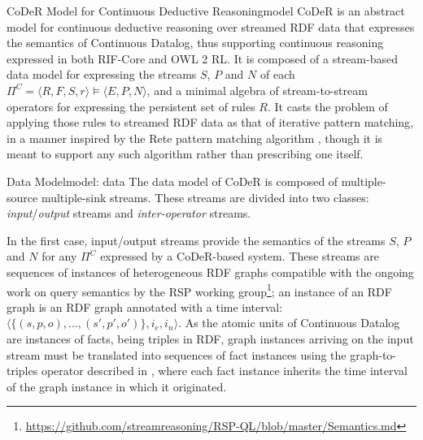 \begin{nestedsection}{CoDeR Model for Continuous Deductive Reasoning}{model}
	CoDeR is an abstract model for continuous deductive reasoning over streamed RDF data that expresses the semantics of Continuous Datalog, thus supporting continuous reasoning expressed in both RIF-Core and OWL 2 RL.
	It is composed of a stream-based data model for expressing the streams $S$, $P$ and $N$ of each ${\Pi^C = \langle R,F,S,r \rangle \vDash \langle E,P,N \rangle}$, and a minimal algebra of stream-to-stream operators for expressing the persistent set of rules $R$.
	It casts the problem of applying those rules to streamed RDF data as that of iterative pattern matching, in a manner inspired by the Rete pattern matching algorithm \citep{forgy79}, though it is meant to support any such algorithm rather than prescribing one itself.

	\begin{nestedsection}{Data Model}{model: data}
		The data model of CoDeR is composed of multiple-source multiple-sink streams.
		These streams are divided into two classes: \emph{input}/\emph{output} streams and \emph{inter-operator} streams.

		In the first case, input/output streams provide the semantics of the streams $S$, $P$ and $N$ for any $\Pi^C$ expressed by a CoDeR-based system.
		These streams are sequences of instances of heterogeneous RDF graphs compatible with the ongoing work on query semantics by the RSP working group\footnote{\url{https://github.com/streamreasoning/RSP-QL/blob/master/Semantics.md}};
		an instance of an RDF graph is an RDF graph annotated with a time interval: ${\langle \{(s,p,o),\dots,(s',p',o')\},i_{e},i_{n} \rangle}$.
		As the atomic units of Continuous Datalog are instances of facts, being triples in RDF, graph instances arriving on the input stream must be translated into sequences of fact instances using the graph-to-triples operator described in , where each fact instance inherits the time interval of the graph instance in which it originated.


\end{nestedsection}
\end{nestedsection}
